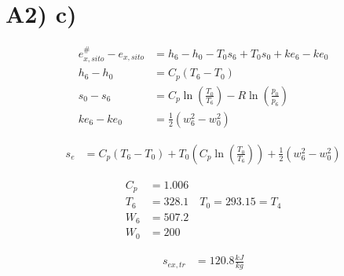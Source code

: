 \section*{A2) c)}

\begin{align*}
    e_{x,sito}^\# - e_{x,sito} &= h_6 - h_0 - T_0 s_6 + T_0 s_0 + ke_6 - ke_0 \\
    h_6 - h_0 &= C_p (T_6 - T_0) \\
    s_0 - s_6 &= C_p \ln \left( \frac{T_0}{T_6} \right) - R \ln \left( \frac{p_0}{p_6} \right) \\
    ke_6 - ke_0 &= \frac{1}{2} (w_6^2 - w_0^2)
\end{align*}

\begin{align*}
    s_e &= C_p (T_6 - T_0) + T_0 \left( C_p \ln \left( \frac{T_0}{T_6} \right) \right) + \frac{1}{2} (w_6^2 - w_0^2)
\end{align*}

\begin{align*}
    C_p &= 1.006 \\
    T_6 &= 328.1 \quad T_0 = 293.15 = T_4 \\
    W_6 &= 507.2 \\
    W_0 &= 200
\end{align*}

\begin{align*}
    s_{ex,tr} &= 120.8 \frac{kJ}{kg}
\end{align*}